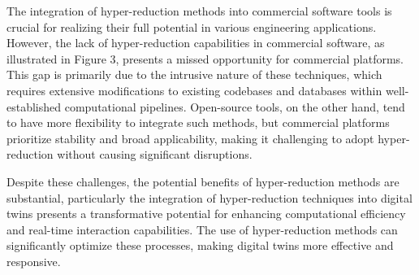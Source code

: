 \documentclass[11pt]{article}
\begin{document}
The integration of hyper-reduction methods into commercial software tools is crucial for realizing their full potential in various engineering applications.
However, the lack of hyper-reduction capabilities in commercial software, as illustrated in Figure 3, presents a missed opportunity for commercial platforms.
This gap is primarily due to the intrusive nature of these techniques, which requires extensive modifications to existing codebases and databases within well-established computational pipelines.
Open-source tools, on the other hand, tend to have more flexibility to integrate such methods, but commercial platforms prioritize stability and broad applicability, making it challenging to adopt hyper-reduction without causing significant disruptions.

Despite these challenges, the potential benefits of hyper-reduction methods are substantial, particularly the integration of hyper-reduction techniques into digital twins presents a transformative potential for enhancing computational efficiency and real-time interaction capabilities.
The use of hyper-reduction methods can significantly optimize these processes, making digital twins more effective and responsive.
\end{document}
